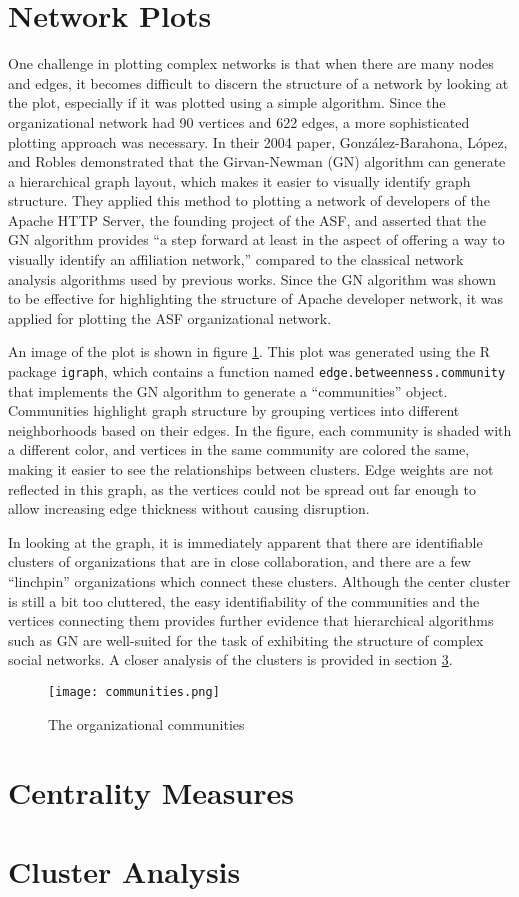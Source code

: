 \section{Network Plots}
One challenge in plotting complex networks is that when there are many nodes and edges, it becomes difficult to discern the structure of a network by looking at the plot, especially if it was plotted using a simple algorithm. Since the organizational network had 90 vertices and 622 edges, a more sophisticated plotting approach was necessary. In their 2004 paper\cite{gonzalez2004community}, Gonz{\'a}lez-Barahona, L{\'o}pez, and Robles demonstrated that the Girvan-Newman (GN) algorithm can generate a hierarchical graph layout, which makes it easier to visually identify graph structure. They applied this method to plotting a network of developers of the Apache HTTP Server, the founding project of the ASF, and asserted that the GN algorithm provides ``a step forward at least in the aspect of offering a way to visually identify an affiliation network,'' compared to the classical network analysis algorithms used by previous works. Since the GN algorithm was shown to be effective for highlighting the structure of Apache developer network, it was applied for plotting the ASF organizational network.

An image of the plot is shown in figure \ref{fig:orgCommunities}. This plot was generated using the R package \verb|igraph|, which contains a function named \verb|edge.betweenness.community| that implements the GN algorithm to generate a ``communities'' object. Communities highlight graph structure by grouping vertices into different neighborhoods based on their edges. In the figure, each community is shaded with a different color, and vertices in the same community are colored the same, making it easier to see the relationships between clusters. Edge weights are not reflected in this graph, as the vertices could not be spread out far enough to allow increasing edge thickness without causing disruption.

In looking at the graph, it is immediately apparent that there are identifiable clusters of organizations that are in close collaboration, and there are a few ``linchpin'' organizations which connect these clusters. Although the center cluster is still a bit too cluttered, the easy identifiability of the communities and the vertices connecting them provides further evidence that hierarchical algorithms such as GN are well-suited for the task of exhibiting the structure of complex social networks. A closer analysis of the clusters is provided in section \ref{clustersection}.
\begin{figure}
	\texttt{[image: communities.png]}
	\centering
	\caption{The organizational communities}
	\label{fig:orgCommunities}
\end{figure}

\section{Centrality Measures}

\section{Cluster Analysis}\label{clustersection}